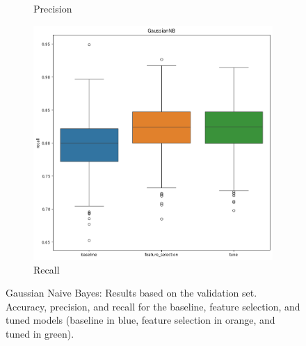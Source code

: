 \documentclass[12pt]{article}
\begin{document}
\begin{figure}[H]
\begin{subfigure}{0.31\textwidth}
        \caption{Precision}
        \label{fig:gnb_prec}
    \end{subfigure}
    \begin{subfigure}{0.31\textwidth}
        \centering
        \includegraphics[width=\linewidth]{ims/gnb_recall.png}
        \caption{Recall}
        \label{fig:gnb_rec}
    \end{subfigure}
    \caption{Gaussian Naive Bayes: Results based on the validation set. Accuracy,
    precision, and recall for the baseline, feature selection, and tuned models
    (baseline in blue, feature selection in orange, and tuned in green).}
    \label{fig:gnb}
\end{figure}
\end{document}
